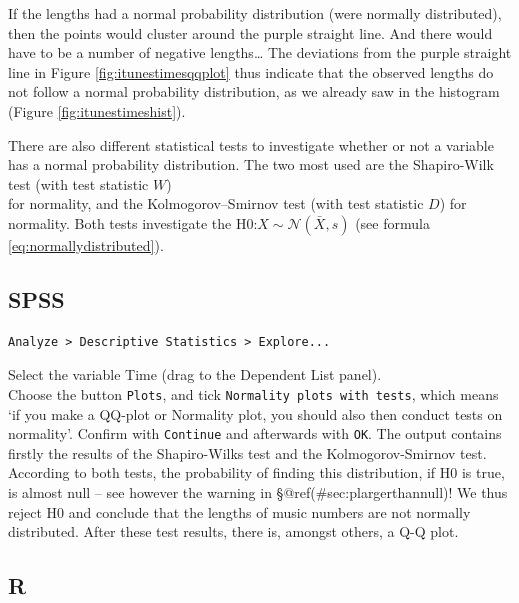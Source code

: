 \documentclass[
]{book}
\newenvironment{Shaded}{\begin{snugshade}}{\end{snugshade}}
\newcommand{\AttributeTok}[1]{\textcolor[rgb]{0.13,0.29,0.53}{#1}}
\newcommand{\CommentTok}[1]{\textcolor[rgb]{0.56,0.35,0.01}{\textit{#1}}}
\newcommand{\ConstantTok}[1]{\textcolor[rgb]{0.56,0.35,0.01}{#1}}
\newcommand{\DecValTok}[1]{\textcolor[rgb]{0.00,0.00,0.81}{#1}}
\newcommand{\FunctionTok}[1]{\textcolor[rgb]{0.13,0.29,0.53}{\textbf{#1}}}
\newcommand{\NormalTok}[1]{#1}
\newcommand{\OtherTok}[1]{\textcolor[rgb]{0.56,0.35,0.01}{#1}}
\newcommand{\SpecialCharTok}[1]{\textcolor[rgb]{0.81,0.36,0.00}{\textbf{#1}}}
\newcommand{\StringTok}[1]{\textcolor[rgb]{0.31,0.60,0.02}{#1}}
\begin{document}
If the lengths had a normal probability distribution (were normally
distributed), then the points would cluster around the purple straight line. And there would have to be a number of negative lengths\ldots{} The deviations from the purple straight line in
Figure \ref{fig:itunestimesqqplot} thus indicate that the observed lengths
do not follow a normal probability distribution, as we already saw in the
histogram (Figure \ref{fig:itunestimeshist}).

There are also different statistical tests to investigate whether or not a variable
has a normal probability distribution. The two most used are the
Shapiro-Wilk test (with test statistic \(W\))\\
for normality, and the Kolmogorov--Smirnov test (with test statistic \(D\)) for
normality. Both tests investigate the
H0:\(X\sim\mathcal{N}(\bar{X},s)\) (see
formula \eqref{eq:normallydistributed}).

\hypertarget{spss-4}{%
\subsection{SPSS}\label{spss-4}}

\begin{verbatim}
Analyze > Descriptive Statistics > Explore...
\end{verbatim}

Select the variable Time (drag to the Dependent List panel).\\
Choose the button \texttt{Plots}, and tick \texttt{Normality\ plots\ with\ tests}, which
means `if you make a QQ-plot or Normality plot, you should also then conduct
tests on normality'.
Confirm with \texttt{Continue} and afterwards with \texttt{OK}. The output contains
firstly the results of the Shapiro-Wilks test and the
Kolmogorov-Smirnov test. According to both tests, the probability of finding
this distribution, if H0 is true, is almost null -- see however the
warning in
§@ref(\#sec:plargerthannull)! We thus reject H0 and conclude that
the lengths of music numbers are not normally distributed. After these
test results, there is, amongst others, a Q-Q plot.

\hypertarget{r-6}{%
\subsection{R}\label{r-6}}

\begin{Shaded}
\end{Shaded}
\end{document}
